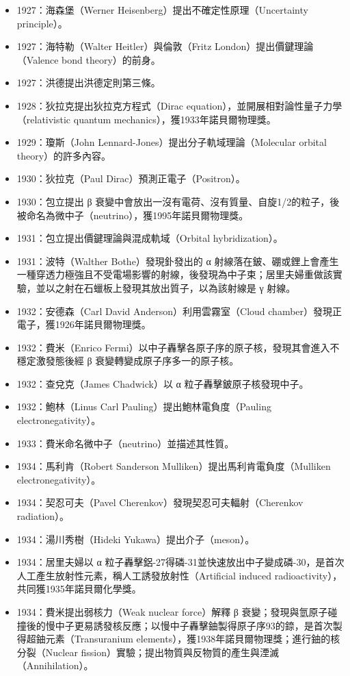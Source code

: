 \documentclass[a4paper,12pt]{article}
\begin{document}
\begin{itemize}
\item 1927：海森堡（Werner Heisenberg）提出不確定性原理（Uncertainty principle）。
\item 1927：海特勒（Walter Heitler）與倫敦（Fritz London）提出價鍵理論（Valence bond theory）的前身。
\item 1927：洪德提出洪德定則第三條。
\item 1928：狄拉克提出狄拉克方程式（Dirac equation），並開展相對論性量子力學（relativistic quantum mechanics），獲1933年諾貝爾物理獎。
\item 1929：瓊斯（John Lennard-Jones）提出分子軌域理論（Molecular orbital theory）的許多內容。
\item 1930：狄拉克（Paul Dirac）預測正電子（Positron）。
\item 1930：包立提出 β 衰變中會放出一沒有電荷、沒有質量、自旋1/2的粒子，後被命名為微中子（neutrino），獲1995年諾貝爾物理獎。
\item 1931：包立提出價鍵理論與混成軌域（Orbital hybridization）。
\item 1931：波特（Walther Bothe）發現釙發出的 α 射線落在鈹、硼或鋰上會產生一種穿透力極強且不受電場影響的射線，後發現為中子束；居里夫婦重做該實驗，並以之射在石蠟板上發現其放出質子，以為該射線是 γ 射線。
\item 1932：安德森（Carl David Anderson）利用雲霧室（Cloud chamber）發現正電子，獲1926年諾貝爾物理獎。
\item 1932：費米（Enrico Fermi）以中子轟擊各原子序的原子核，發現其會進入不穩定激發態後經 β 衰變轉變成原子序多一的原子核。
\item 1932：查兌克（James Chadwick）以 α 粒子轟擊鈹原子核發現中子。
\item 1932：鮑林（Linus Carl Pauling）提出鮑林電負度（Pauling electronegativity）。
\item 1933：費米命名微中子（neutrino）並描述其性質。
\item 1934：馬利肯（Robert Sanderson Mulliken）提出馬利肯電負度（Mulliken electronegativity）。
\item 1934：契忍可夫（Pavel Cherenkov）發現契忍可夫輻射（Cherenkov radiation）。
\item 1934：湯川秀樹（Hideki Yukawa）提出介子（meson）。
\item 1934：居里夫婦以 α 粒子轟擊鋁-27得磷-31並快速放出中子變成磷-30，是首次人工產生放射性元素，稱人工誘發放射性（Artificial induced radioactivity），共同獲1935年諾貝爾化學獎。
\item 1934：費米提出弱核力（Weak nuclear force）解釋 β 衰變；發現與氫原子碰撞後的慢中子更易誘發核反應；以慢中子轟擊鈾製得原子序93的錼，是首次製得超鈾元素（Transuranium elements），獲1938年諾貝爾物理獎；進行鈾的核分裂（Nuclear fission）實驗；提出物質與反物質的產生與湮滅（Annihilation）。

\end{itemize}
\end{document}
